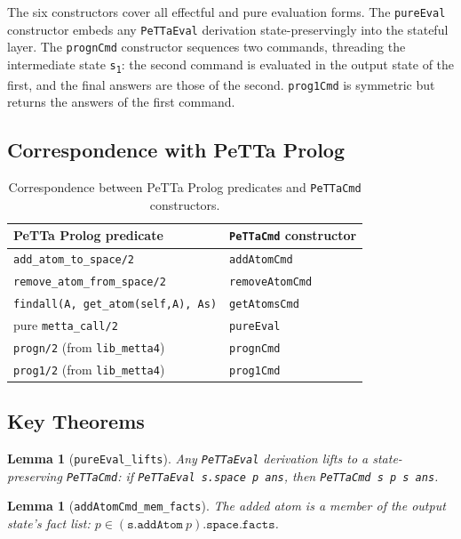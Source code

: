 \documentclass[]{article}
\newtheorem{lemma}[theorem]{Lemma}
\newcommand{\code}[1]{\texttt{#1}}
\begin{document}
The six constructors cover all effectful and pure evaluation forms.
The \code{pureEval} constructor embeds any \code{PeTTaEval} derivation
state-preservingly into the stateful layer.  The \code{prognCmd} constructor
sequences two commands, threading the intermediate state \code{s\textsubscript{1}}:
the second command is evaluated in the output state of the first, and the
final answers are those of the second.  \code{prog1Cmd} is symmetric but
returns the answers of the first command.

\subsection{Correspondence with PeTTa Prolog}

\begin{table}[H]
\centering
\begin{tabular}{ll}
\hline
\textbf{PeTTa Prolog predicate} & \textbf{\code{PeTTaCmd} constructor} \\
\hline
\code{add\_atom\_to\_space/2}                       & \code{addAtomCmd}   \\
\code{remove\_atom\_from\_space/2}                  & \code{removeAtomCmd} \\
\code{findall(A, get\_atom(self,A), As)}             & \code{getAtomsCmd}  \\
pure \code{metta\_call/2}                           & \code{pureEval}     \\
\code{progn/2} (from \code{lib\_metta4})            & \code{prognCmd}     \\
\code{prog1/2} (from \code{lib\_metta4})            & \code{prog1Cmd}     \\
\hline
\end{tabular}
\caption{Correspondence between PeTTa Prolog predicates and \code{PeTTaCmd} constructors.}
\label{tab:cmd-prolog}
\end{table}

\subsection{Key Theorems}

\begin{lemma}[\code{pureEval\_lifts}]
Any \code{PeTTaEval} derivation lifts to a state-preserving \code{PeTTaCmd}:
if \code{PeTTaEval s.space p ans}, then \code{PeTTaCmd s p s ans}.
\end{lemma}

\begin{lemma}[\code{addAtomCmd\_mem\_facts}]
The added atom is a member of the output state's fact list:
$p \in (\code{s.addAtom}\ p)\code{.space.facts}$.
\end{lemma}
\end{document}
